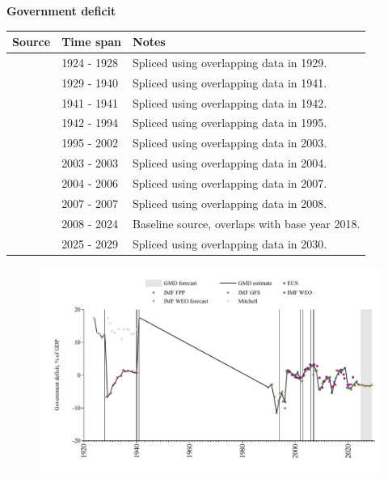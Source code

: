 \documentclass[12pt,a4paper,landscape]{article}
\begin{document}
\begin{adjustbox}{max totalsize={\paperwidth}{\paperheight},center}
\begin{minipage}[t][\textheight][t]{\textwidth}
\vspace*{0.5cm}
{}
\begin{center}
{\Large\bfseries Government deficit}
\end{center}
\vspace{0.5cm}
\begin{table}[H]
\centering
\small
\begin{tabular}{|l|l|l|}
\hline
\textbf{Source} & \textbf{Time span} & \textbf{Notes} \\
\hline
\rowcolor{white}\cite{Mitchell}& 1924 - 1928 &Spliced using overlapping data in 1929. \\
\rowcolor{lightgray}\cite{IMF_FPP}& 1929 - 1940 &Spliced using overlapping data in 1941. \\
\rowcolor{white}\cite{Mitchell}& 1941 - 1941 &Spliced using overlapping data in 1942. \\
\rowcolor{lightgray}\cite{IMF_GFS}& 1942 - 1994 &Spliced using overlapping data in 1995. \\
\rowcolor{white}\cite{EUS}& 1995 - 2002 &Spliced using overlapping data in 2003. \\
\rowcolor{lightgray}\cite{IMF_WEO}& 2003 - 2003 &Spliced using overlapping data in 2004. \\
\rowcolor{white}\cite{EUS}& 2004 - 2006 &Spliced using overlapping data in 2007. \\
\rowcolor{lightgray}\cite{IMF_WEO}& 2007 - 2007 &Spliced using overlapping data in 2008. \\
\rowcolor{white}\cite{EUS}& 2008 - 2024 &Baseline source, overlaps with base year 2018. \\
\rowcolor{lightgray}\cite{IMF_WEO_forecast}& 2025 - 2029 &Spliced using overlapping data in 2030. \\
\hline
\end{tabular}
\end{table}
\begin{figure}[H]
\centering
\includegraphics[width=\textwidth,height=0.6\textheight,keepaspectratio]{graphs/BGR_govdef_GDP.pdf}
\end{figure}
\end{minipage}
\end{adjustbox}
\end{document}

